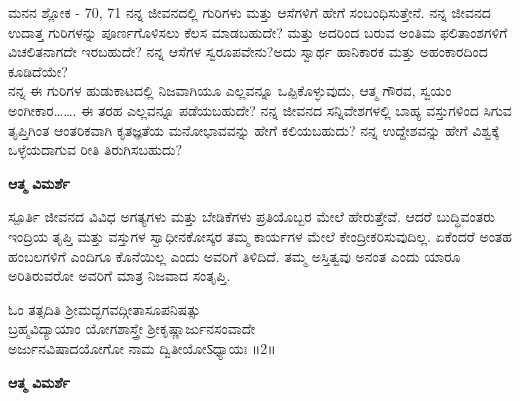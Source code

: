 \newpage
\begin{mananam}{\mananamfont ಮನನ ಶ್ಲೋಕ - \textenglish{70, 71}}
\footnotesize \mananamtext ನನ್ನ ಜೀವನದಲ್ಲಿ ಗುರಿಗಳು ಮತ್ತು ಆಸೆಗಳಿಗೆ ಹೇಗೆ ಸಂಬಂಧಿಸುತ್ತೇನೆ. ನನ್ನ ಜೀವನದ ಉದಾತ್ತ   ಗುರಿಗಳನ್ನು ಪೂರ್ಣಗೊಳಿಸಲು ಕೆಲಸ ಮಾಡಬಹುದೇ? ಮತ್ತು ಅದರಿಂದ ಬರುವ ಅಂತಿಮ ಫಲಿತಾಂಶಗಳಿಗೆ ವಿಚಲಿತನಾಗದೇ ಇರಬಹುದೇ? ನನ್ನ ಆಸೆಗಳ ಸ್ವರೂಪವೇನು?ಅದು ಸ್ವಾರ್ಥ ಹಾನಿಕಾರಕ ಮತ್ತು ಅಹಂಕಾರದಿಂದ ಕೂಡಿದೆಯೇ?\\
ನನ್ನ ಈ ಗುರಿಗಳ ಹುಡುಕಾಟದಲ್ಲಿ ನಿಜವಾಗಿಯೂ ಎಲ್ಲವನ್ನೂ ಒಪ್ಪಿಕೊಳ್ಳುವುದು, ಆತ್ಮ ಗೌರವ, ಸ್ವಯಂ  ಅಂಗೀಕಾರ……. ಈ ತರಹ ಎಲ್ಲವನ್ನೂ ಪಡೆಯಬಹುದೇ? ನನ್ನ ಜೀವನದ ಸನ್ನಿವೇಶಗಳಲ್ಲಿ ಬಾಹ್ಯ ವಸ್ತುಗಳಿಂದ ಸಿಗುವ ತೃಪ್ತಿಗಿಂತ ಆಂತರಿಕವಾಗಿ ಕೃತಜ್ಞತೆಯ ಮನೋಭಾವವನ್ನು ಹೇಗೆ ಕಲಿಯಬಹುದು? ನನ್ನ ಉದ್ದೇಶವನ್ನು ಹೇಗೆ ವಿಶ್ವಕ್ಕೆ ಒಳ್ಳೆಯದಾಗುವ ರೀತಿ ತಿರುಗಿಸಬಹುದು?
\end{mananam}
\WritingHand\enspace\textbf{ಆತ್ಮ ವಿಮರ್ಶೆ}
\begin{inspiration}{\mananamfont ಸ್ಪೂರ್ತಿ}
\footnotesize \mananamtext ಜೀವನದ ವಿವಿಧ ಅಗತ್ಯಗಳು ಮತ್ತು ಬೇಡಿಕೆಗಳು ಪ್ರತಿಯೊಬ್ಬರ ಮೇಲೆ ಹೇರುತ್ತೇವೆ. ಆದರೆ ಬುದ್ಧಿವಂತರು ಇಂದ್ರಿಯ ತೃಪ್ತಿ ಮತ್ತು ವಸ್ತುಗಳ ಸ್ವಾಧೀನಕೋಸ್ಕರ  ತಮ್ಮ ಕಾರ್ಯಗಳ ಮೇಲೆ ಕೇಂದ್ರೀಕರಿಸುವುದಿಲ್ಲ. ಏಕೆಂದರೆ ಅಂತಹ ಹಂಬಲಗಳಿಗೆ ಎಂದಿಗೂ ಕೊನೆಯಿಲ್ಲ ಎಂದು ಅವರಿಗೆ ತಿಳಿದಿದೆ. ತಮ್ಮ ಅಸ್ತಿತ್ವವು ಅನಂತ ಎಂದು ಯಾರೂ ಅರಿತಿರುವರೋ ಅವರಿಗೆ ಮಾತ್ರ ನಿಜವಾದ ಸಂತೃಪ್ತಿ.
\end{inspiration}
\newpage


\begin{center}
{\tiny\color{brown}
ಓಂ ತತ್ಸದಿತಿ ಶ್ರೀಮದ್ಭಗವದ್ಗೀತಾಸೂಪನಿಷತ್ಸು \\
ಬ್ರಹ್ಮವಿದ್ಯಾಯಾಂ ಯೋಗಶಾಸ್ತ್ರೇ ಶ್ರೀಕೃಷ್ಣಾರ್ಜುನಸಂವಾದೇ\\
ಅರ್ಜುನವಿಷಾದಯೋಗೋ ನಾಮ ದ್ವಿತೀಯೋऽಧ್ಯಾಯಃ ॥2॥\\}
\end{center}

\WritingHand\enspace\textbf{ಆತ್ಮ ವಿಮರ್ಶೆ}